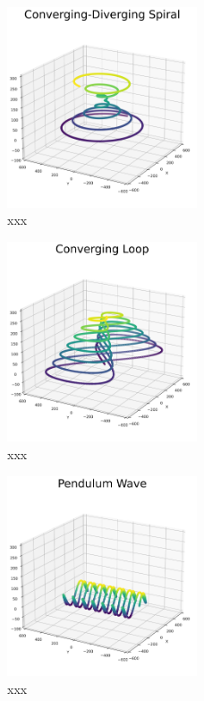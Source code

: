  \begin{figure}[H]
	\centerline{\includegraphics[width=0.5\textwidth]{figures/path1.png}}
	\caption{xxx}
	\label{xxx}
\end{figure}
\begin{figure}[H]
	\centerline{\includegraphics[width=0.5\textwidth]{figures/path2.png}}
	\caption{xxx}
	\label{xxxx}
\end{figure}
\begin{figure}[H]
	\centerline{\includegraphics[width=0.5\textwidth]{figures/path3.png}}
	\caption{xxx}
	\label{xxxx}
\end{figure}

